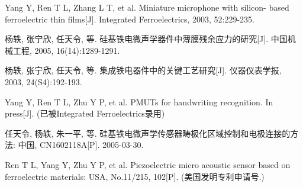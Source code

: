 \begin{publications}{99}
    
    \item{Yang Y, Ren T L, Zhang L T, et al}. Miniature microphone with silicon- based ferroelectric thin films[J]. Integrated Ferroelectrics, 2003, 52:229-235.
    \item{杨轶, 张宁欣, 任天令, 等}. 硅基铁电微声学器件中薄膜残余应力的研究[J]. 中国机械工程, 2005, 16(14):1289-1291. 
    \item{杨轶, 张宁欣, 任天令, 等}. 集成铁电器件中的关键工艺研究[J]. 仪器仪表学报, 2003, 24(S4):192-193. 
    \item{Yang Y, Ren T L, Zhu Y P, et al}. PMUTs for handwriting recognition. In press[J]. (已被Integrated Ferroelectrics录用)
    
    \item{任天令, 杨轶, 朱一平, 等}. 硅基铁电微声学传感器畴极化区域控制和电极连接的方法: 中国, CN1602118A[P]. 2005-03-30.
    \item{Ren T L, Yang Y, Zhu Y P, et al}. Piezoelectric micro acoustic sensor based on ferroelectric materials: USA, No.11/215, 102[P]. (美国发明专利申请号.)
    
\end{publications}
